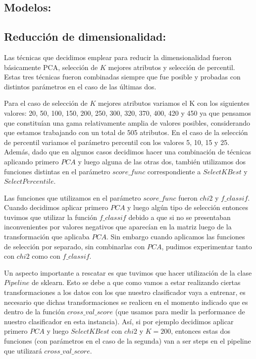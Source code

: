 \documentclass[a4paper]{article}
\begin{document}
\subsection{Modelos:}





\subsection{Reducción de dimensionalidad:}
Las técnicas que decidimos emplear para reducir la dimensionalidad fueron básicamente PCA, selección de $K$ mejores atributos y selección de percentil. Estas tres técnicas fueron combinadas siempre que fue posible y probadas con distintos parámetros en el caso de las últimas dos.

Para el caso de selección de $K$ mejores atributos variamos el K con los siguientes valores: 20, 50, 100, 150, 200, 250, 300, 320, 370, 400, 420 y 450 ya que pensamos que constituían una gama relativamente amplia de valores posibles, considerando que estamos trabajando con un total de 505 atributos. En el caso de la selección de percentil variamos el parámetro percentil con los valores 5, 10, 15 y 25. Además, dado que en algunos casos decidimos hacer una combinación de técnicas aplicando primero $PCA$ y luego alguna de las otras dos, también utilizamos dos funciones distintas en el parámetro $score\_func$ correspondiente a $SelectKBest$ y $SelectPercentile$.

Las funciones que utilizamos en el parámetro $score\_func$ fueron $chi2$ y $f\_classif$. Cuando decidimos aplicar primero $PCA$ y luego algún tipo de selección entonces tuvimos que utilizar la función $f\_classif$ debido a que si no se presentaban inconvenientes por valores negativos que aparecían en la matriz luego de la transformación que aplicaba $PCA$. Sin embargo cuando aplicamos las funciones de selección por separado, sin combinarlas con $PCA$, pudimos experimentar tanto con $chi2$ como con $f\_classif$.

Un aspecto importante a rescatar es que tuvimos que hacer utilización de la clase $Pipeline$ de sklearn. Esto se debe a que como vamos a estar realizando ciertas transformaciones a los datos con los que nuestro clasificador vaya a entrenar, es necesario que dichas transformaciones se realicen en el momento indicado que es dentro de la función $cross\_val\_score$ (que usamos para medir la performance de nuestro clasificador en esta instancia). Así, si por ejemplo decidimos aplicar primero $PCA$ y luego $SelectKBest$ con $chi2$ y $K = 200$, entonces estas dos funciones (con parámetros en el caso de la segunda) van a ser steps en el pipeline que utilizará $cross\_val\_score$.
\end{document}
